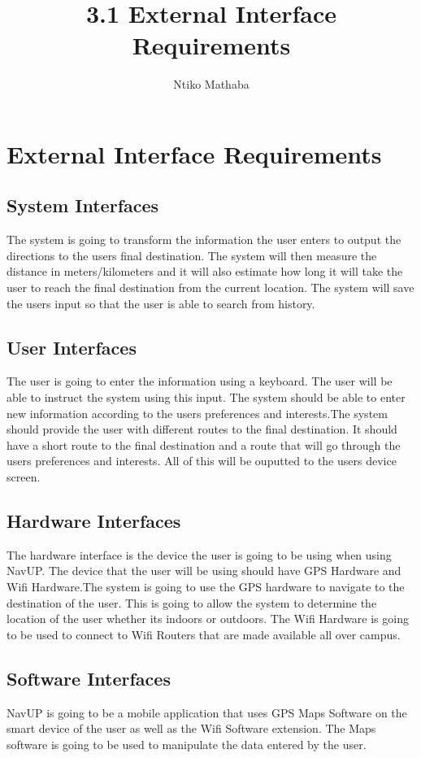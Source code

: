 \documentclass[12pt]{article}
\title{3.1 External Interface Requirements}
\author{Ntiko Mathaba}
\begin{document}
	\section{External Interface Requirements}
		\subsection{System Interfaces}
		The system is going to transform the information the user enters to output the directions to the users final destination. The system will then measure the distance in meters/kilometers and it will also estimate how long it will take the user to reach the final destination from the current location. The system will save the users input so that the user is able to search from history.
		
		\subsection{User Interfaces}
		The user is going to enter the information using a keyboard. The user will be able to instruct the system using this input. The system should be able to enter new information according to the users preferences and interests.The system should provide the user with different routes to the final destination. It should have a short route to the final destination and a route that will go through the users preferences and interests. All of this will be ouputted to the users device screen.
		
		\subsection{Hardware Interfaces}
		The hardware interface is the device the user is going to be using when using NavUP. The device that the user will be using should have GPS Hardware and Wifi Hardware.The system is going to use the GPS hardware to navigate to the destination of the user. This is going to allow the system to determine the location of the user whether its indoors or outdoors. The Wifi Hardware is going to be used to connect to Wifi Routers that are made available all over campus.

		\subsection{Software Interfaces}
		NavUP is going to be a mobile application that uses GPS Maps Software on the smart device of the user as well as the Wifi Software extension. The Maps software is going to be used to manipulate the data entered by the user.
\end{document}
